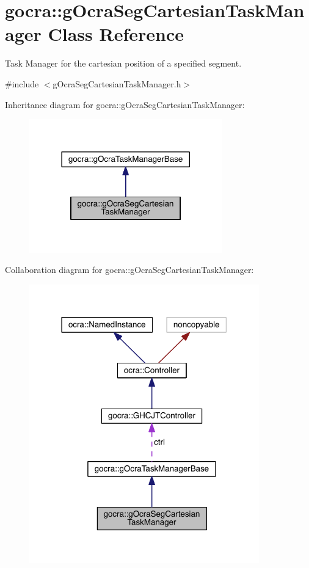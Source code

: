 \hypertarget{classgocra_1_1gOcraSegCartesianTaskManager}{}\section{gocra\+:\+:g\+Ocra\+Seg\+Cartesian\+Task\+Manager Class Reference}
\label{classgocra_1_1gOcraSegCartesianTaskManager}


Task Manager for the cartesian position of a specified segment.  




{\ttfamily \#include $<$g\+Ocra\+Seg\+Cartesian\+Task\+Manager.\+h$>$}



Inheritance diagram for gocra\+:\+:g\+Ocra\+Seg\+Cartesian\+Task\+Manager\+:\nopagebreak
\begin{figure}[H]
\begin{center}
\leavevmode
\includegraphics[width=237pt]{db/dfa/classgocra_1_1gOcraSegCartesianTaskManager__inherit__graph}
\end{center}
\end{figure}


Collaboration diagram for gocra\+:\+:g\+Ocra\+Seg\+Cartesian\+Task\+Manager\+:\nopagebreak
\begin{figure}[H]
\begin{center}
\leavevmode
\includegraphics[width=282pt]{d6/d7e/classgocra_1_1gOcraSegCartesianTaskManager__coll__graph}
\end{center}
\end{figure}
